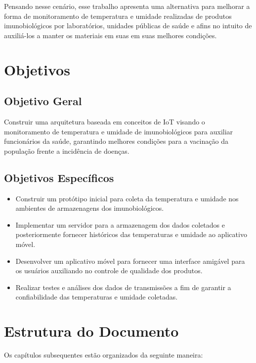 Pensando nesse cenário, esse trabalho apresenta uma alternativa para melhorar a forma de monitoramento de temperatura e umidade realizadas de produtos imunobiológicos por laboratórios, unidades públicas de saúde e afins no intuito de auxiliá-los a manter os materiais em suas em suas melhores condições.

\section{Objetivos}
\label{intro:objetivos}

\subsection{Objetivo Geral}
\label{intro:objetivos:geral}
Construir uma arquitetura baseada em conceitos de IoT visando o monitoramento de temperatura e umidade de imunobiológicos para auxiliar funcionários da saúde, garantindo melhores condições para a vacinação da população frente a incidência de doenças.

\subsection{Objetivos Específicos}
\label{intro:objetivos:especificos}
\begin{itemize}
  \item Construir um protótipo inicial para coleta da temperatura e umidade nos ambientes de armazenagens dos imunobiológicos.
  \item Implementar um servidor para a armazenagem dos dados coletados e posteriormente fornecer históricos das temperaturas e umidade ao aplicativo móvel.
  \item Desenvolver um aplicativo móvel para fornecer uma interface amigável para os usuários auxiliando no controle de qualidade dos produtos.
  \item Realizar testes e análises dos dados de transmissões a fim de garantir a confiabilidade das temperaturas e umidade coletadas.
\end{itemize}




\section{Estrutura do Documento}
\label{intro:estrutura}

Os capítulos subsequentes estão organizados da seguinte maneira:

